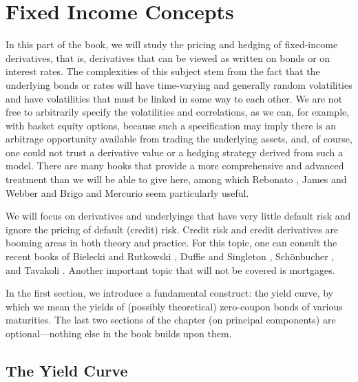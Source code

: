 \chapter[Fixed Income Concepts]{Fixed Income Concepts}\label{c_fixedincomeconcepts}

In this part of the book, we will study the pricing and hedging of fixed-income derivatives, that is, derivatives that can be viewed as written on bonds or on interest rates.  The complexities of this subject stem from the fact that the underlying bonds or rates will have time-varying and generally random volatilities and have volatilities that must be linked in some way to each other.  We are not free to arbitrarily specify the volatilities and correlations, as we can, for example, with basket equity options, because such a specification may imply there is an arbitrage opportunity available from trading the underlying assets, and, of course, one could not trust a derivative value or a hedging strategy derived from such a model.  There are many books that provide a more comprehensive and advanced treatment than we will be able to give here, among which  Rebonato \cite{Rebonato98, Rebonato02}, James and Webber \cite{JW} and Brigo and Mercurio \cite{BM} seem particularly useful.

We will focus on derivatives and underlyings that have very little default risk and ignore the pricing of default (credit) risk.  Credit risk and credit derivatives are booming areas in both theory and practice.  For this topic, one can consult the recent books of Bielecki and Rutkowski \cite{BR}, Duffie and Singleton \cite{DS}, Sch{\"o}nbucher \cite{Schonbucher}, and Tavakoli \cite{Tavakoli}. 
Another important topic that will not be covered is mortgages.

In the first section, we introduce a fundamental construct: the yield curve, by which we mean the yields of (possibly theoretical) zero-coupon bonds of various maturities.  The last two sections of the chapter (on principal components) are optional---nothing else in the book builds upon them.

\section{The Yield Curve}\label{s_yieldcurve}

